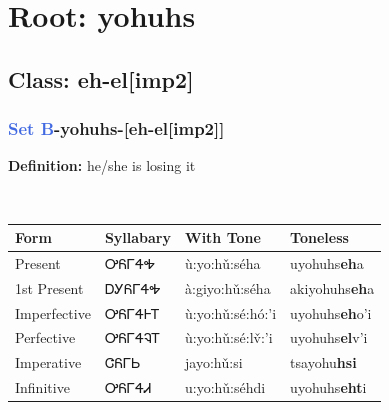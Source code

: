 \needspace{4in}
\section*{Root: yohuhs}
\nopagebreak
{}
\needspace{3in}
\subsection*{Class: eh-el[imp2]}
\nopagebreak
\needspace{2in}
\subsubsection*{\textcolor{RoyalBlue}{Set B}{-}\textbf{yohuhs}{-}[eh-el[imp2]]}
\nopagebreak
\textbf{Definition: } he/she is losing it
\\[0.5em]
\begin{tabularx}{\textwidth}{l X X X}%
\toprule%
\textbf{Form}&\textbf{Syllabary}&\textbf{With Tone}&\textbf{Toneless}\\%
\midrule%
Present&ᎤᏲᎱᏎᎭ&ù:yo:hǔ:séha&uyohuhs\textbf{eh}a\\%
1st Present&ᎠᎩᏲᎱᏎᎭ&à:giyo:hǔ:séha&akiyohuhs\textbf{eh}a\\%
Imperfective&ᎤᏲᎱᏎᎰᎢ&ù:yo:hǔ:sé:hó:’i&uyohuhs\textbf{eh}o'i\\%
Perfective&ᎤᏲᎱᏎᎸᎢ&ù:yo:hǔ:sé:lv̌:’i&uyohuhs\textbf{el}v'i\\%
Imperative&ᏣᏲᎱᏏ&jayo:hǔ:si&tsayohu\textbf{hsi}\\%
Infinitive&ᎤᏲᎱᏎᏗ&u:yo:hǔ:séhdi&uyohuhs\textbf{eht}i\\%
\bottomrule%
\end{tabularx}
\\[1em]